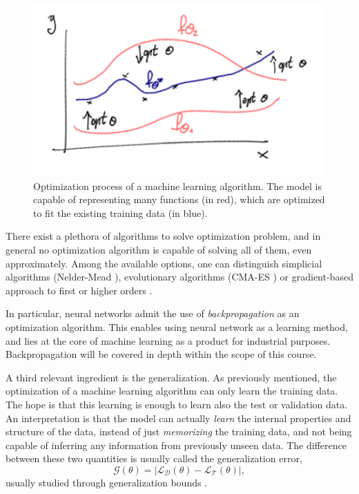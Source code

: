 \documentclass[]{report}
\begin{document}
\begin{figure}
\centering
\includegraphics[width = .7\linewidth]{images/optimization}
\caption{Optimization process of a machine learning algorithm. The model is capable of representing many functions (in red), which are optimized to fit the existing training data (in blue). }
\label{fig.optimization}
\end{figure}

There exist a plethora of algorithms to solve optimization problem, and in general no optimization algorithm is capable of solving all of them, even approximately. Among the available options, one can distinguish simplicial algorithms (Nelder-Mead \cite{nelder1965simplex}), evolutionary algorithms (CMA-ES \cite{hansen2006cma}) or gradient-based approach to first or higher orders \cite{kingma2017adam, byrd1995limited, nocedal2006fundamentals}. 

In particular, neural networks admit the use of \textit{backpropagation} as an optimization algorithm. This enables using neural network as a learning method, and lies at the core of machine learning as a product for industrial purposes. Backpropagation will be covered in depth within the scope of this course. 
  
A third relevant ingredient is the generalization. As previously mentioned, the optimization of a machine learning algorithm can only learn the training data. The hope is that this learning is enough to learn also the test or validation data. An interpretation is that the model can actually \textit{learn} the internal properties and structure of the data, instead of just \textit{memorizing} the training data, and not being capable of inferring any information from previously unseen data. The difference between these two quantities is usually called the generalization error, 
\begin{equation}
    \mathcal G(\theta) = \left\vert \mathcal L_{\mathcal D}(\theta) - \mathcal L_{\mathcal T}(\theta) \right\vert,
\end{equation}
usually studied through generalization bounds \cite{wolf2023mathematical}. 
\end{document}
